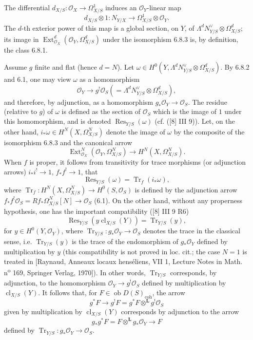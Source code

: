 \documentclass[11pt]{article}
\DeclareMathOperator{\Ext}{Ext}
\newcommand{\ob}{\operatorname{ob}}
\providecommand{\cl}{\operatorname{cl}}
\providecommand{\OO}{\mathcal{O}}
\providecommand{\LL}{\mathbf L}
\providecommand{\coh}{\mathrm{coh}}
\providecommand{\ob}{\operatorname{ob}}
\providecommand{\cl}{\operatorname{cl}}
\providecommand{\coh}{\mathrm{coh}}
\providecommand{\cl}{\operatorname{cl}}
\begin{document}
The differential $d_{X/S}:\OO_X\to\Omega^1_{X/S}$ induces an $\OO_Y$-linear map
\[
d_{X/S}\otimes 1:N_{Y/X}\longrightarrow \Omega^1_{X/S}\otimes\OO_Y.
\]
The $d$-th exterior power of this map is a global section, on $Y$, of $\Lambda^d N_{Y/S}^{\vee}\otimes\Omega^d_{X/S}$; its image in $\Ext^d_{\OO_X}(\OO_Y,\Omega^d_{X/S})$ under the isomorphism 6.8.3 is, by definition, the class 6.8.1.

Assume $g$ finite and flat (hence $d=N$). Let $\omega\in H^0(Y,\Lambda^d N_{Y/S}^{\vee}\otimes\Omega^d_{X/S})$. By 6.8.2 and 6.1, one may view $\omega$ as a homomorphism
\[
\OO_Y\longrightarrow g^!\OO_S(=\Lambda^d N_{Y/S}^{\vee}\otimes\Omega^d_{X/S}),
\]
and therefore, by adjunction, as a homomorphism $g_*\OO_Y\to\OO_S$. The residue (relative to $g$) of $\omega$ is defined as the section of $\OO_S$ which is the image of $1$ under this homomorphism, and is denoted $\operatorname{Res}_{Y/S}(\omega)$ (cf. ([8] III 9)). Let, on the other hand, $i_*\omega\in H^N(X,\Omega^N_{X/S})$ denote the image of $\omega$ by the composite of the isomorphism 6.8.3 and the canonical arrow
\[
\Ext^N_{\OO_X}(\OO_Y,\Omega^N_{X/S})\longrightarrow H^N(X,\Omega^N_{X/S}).
\]
When $f$ is proper, it follows from transitivity for trace morphisms (or adjunction arrows) $i_*i^!\to 1$, $f_*f^!\to 1$, that
\begin{equation}
\tag{6.8.4}
\operatorname{Res}_{Y/S}(\omega)=\operatorname{Tr}_f(i_*\omega),
\end{equation}
where $\operatorname{Tr}_f:H^N(X,\Omega^N_{X/S})\to H^0(S,\OO_S)$ is defined by the adjunction arrow $f_*f^!\OO_S=Rf_*\Omega^N_{X/S}[N]\to\OO_S$ (6.1). On the other hand, without any properness hypothesis, one has the important compatibility ([8] III 9 R6)
\begin{equation}
\tag{6.8.5}
\operatorname{Res}_{Y/S}(y\cl_{X/S}(Y))=\operatorname{Tr}_{Y/S}(y),
\end{equation}
for $y\in H^0(Y,\OO_Y)$, where $\operatorname{Tr}_{Y/S}:g_*\OO_Y\to\OO_S$ denotes the trace in the classical sense, i.e. $\operatorname{Tr}_{Y/S}(y)$ is the trace of the endomorphism of $g_*\OO_Y$ defined by multiplication by $y$ (this compatibility is not proved in loc. cit.; the case $N=1$ is treated in [Raynaud, Anneaux locaux henséliens, VII 1, Lecture Notes in Math. n\textsuperscript{o} 169, Springer Verlag, 1970]). In other words, $\operatorname{Tr}_{Y/S}$ corresponds, by adjunction, to the homomorphism $\OO_Y\to g^!\OO_S$ defined by multiplication by $\cl_{X/S}(Y)$. It follows that, for $F\in\ob D(S)_{\coh}$, the arrow
\begin{equation}
\tag{6.8.6}
g^*F\longrightarrow g^!F=g^*F\otimes^{\LL}g^!\OO_S
\end{equation}
given by multiplication by $\cl_{X/S}(Y)$ corresponds by adjunction to the arrow
\begin{equation}
\tag{6.8.7}
g_*g^*F=F\otimes^{\LL}g_*\OO_Y\longrightarrow F
\end{equation}
defined by $\operatorname{Tr}_{Y/S}:g_*\OO_Y\to\OO_S$.
\end{document}

